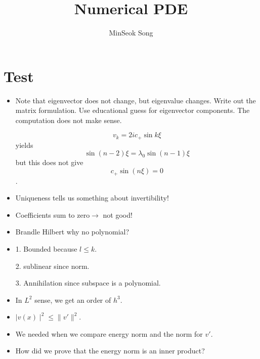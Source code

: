 \documentclass{article}
\title{Numerical PDE}
\author{MinSeok Song}
\date{}
\theoremstyle{remark}
\begin{document}
\maketitle 
\section*{Test}
\begin{itemize}
\item Note that eigenvector does not change, but eigenvalue changes. Write out the matrix formulation. Use educational guess for eigenvector components. The computation does not make sense. 

$$v_k=2ic_+ \sin k\xi$$ yields
$$\sin(n-2)\xi=\lambda_0\sin (n-1)\xi$$
but this does not give
$$c_+\sin(n\xi)=0$$.
\item Uniqueness tells us something about invertibility! 
\item Coefficients sum to zero$\to$ not good!
\item Brandle Hilbert why no polynomial?
\item 1. Bounded because $l\leq k$.

2. sublinear since norm.

3. Annihilation since subspace is a polynomial.

\item In $L^2$ sense, we get an order of $h^3$.

\item $\mid v(x)\mid^2\leq\lVert v'\rVert^2$.
\item We needed when we compare energy norm and the norm for $v'$.
\item How did we prove that the energy norm is an inner product?





\end{itemize}
\end{document}
